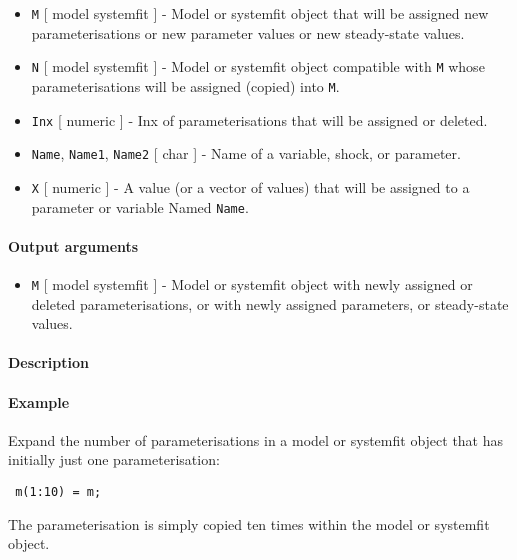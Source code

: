  \begin{itemize}
 \item
   \texttt{M} {[} model \textbar{} systemfit {]} - Model or systemfit
   object that will be assigned new parameterisations or new parameter
   values or new steady-state values.
 \item
   \texttt{N} {[} model \textbar{} systemfit {]} - Model or systemfit
   object compatible with \texttt{M} whose parameterisations will be
   assigned (copied) into \texttt{M}.
 \item
   \texttt{Inx} {[} numeric {]} - Inx of parameterisations that will be
   assigned or deleted.
 \item
   \texttt{Name}, \texttt{Name1}, \texttt{Name2} {[} char {]} - Name of a
   variable, shock, or parameter.
 \item
   \texttt{X} {[} numeric {]} - A value (or a vector of values) that will
   be assigned to a parameter or variable Named \texttt{Name}.
 \end{itemize}
 
 \paragraph{Output arguments}
 
 \begin{itemize}
 \item
   \texttt{M} {[} model \textbar{} systemfit {]} - Model or systemfit
   object with newly assigned or deleted parameterisations, or with newly
   assigned parameters, or steady-state values.
 \end{itemize}
 
 \paragraph{Description}
 
 \paragraph{Example}
 
 Expand the number of parameterisations in a model or systemfit object
 that has initially just one parameterisation:
 
 \begin{verbatim}
 m(1:10) = m;
 \end{verbatim}
 
 The parameterisation is simply copied ten times within the model or
 systemfit object.


